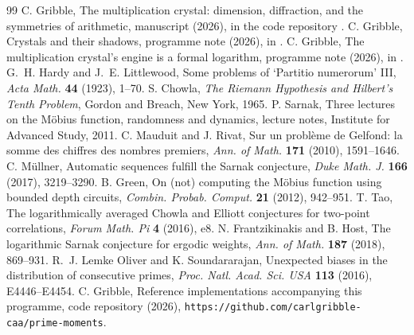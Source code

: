 \documentclass[11pt]{article}
\theoremstyle{remark}
\begin{document}
\begin{thebibliography}{99}
 C. Gribble, The multiplication crystal: dimension, diffraction, and the
symmetries of arithmetic, manuscript (2026), in the code repository \cite{Code}.
 C. Gribble, Crystals and their shadows, programme note (2026), in \cite{Code}.
 C. Gribble, The multiplication crystal's engine is a formal logarithm, programme
note (2026), in \cite{Code}.
 G.~H. Hardy and J.~E. Littlewood, Some problems of `Partitio numerorum'
III, \emph{Acta Math.} \textbf{44} (1923), 1--70.
 S. Chowla, \emph{The Riemann Hypothesis and Hilbert's Tenth Problem}, Gordon and
Breach, New York, 1965.
 P. Sarnak, Three lectures on the M\"obius function, randomness and dynamics,
lecture notes, Institute for Advanced Study, 2011.
 C. Mauduit and J. Rivat, Sur un probl\`eme de Gelfond: la somme des
chiffres des nombres premiers, \emph{Ann. of Math.} \textbf{171} (2010), 1591--1646.
 C. M\"ullner, Automatic sequences fulfill the Sarnak conjecture, \emph{Duke
Math. J.} \textbf{166} (2017), 3219--3290.
 B. Green, On (not) computing the M\"obius function using bounded depth
circuits, \emph{Combin. Probab. Comput.} \textbf{21} (2012), 942--951.
 T. Tao, The logarithmically averaged Chowla and Elliott conjectures for
two-point correlations, \emph{Forum Math. Pi} \textbf{4} (2016), e8.
 N. Frantzikinakis and B. Host, The logarithmic Sarnak conjecture for ergodic
weights, \emph{Ann. of Math.} \textbf{187} (2018), 869--931.
 R.~J. Lemke Oliver and K. Soundararajan, Unexpected biases in the distribution of
consecutive primes, \emph{Proc. Natl. Acad. Sci. USA} \textbf{113} (2016), E4446--E4454.
 C. Gribble, Reference implementations accompanying this programme, code repository
(2026), \texttt{https://github.com/carlgribble-caa/prime-moments}.
\end{thebibliography}
\end{document}
